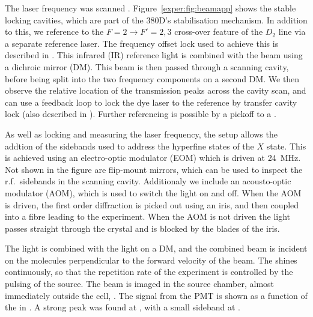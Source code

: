 The laser frequency was scanned . Figure~\ref{exper:fig:beamapp} shows the stable locking cavities,
which are part of the 380D's stabilisation mechanism. In addition to this, we
reference  to the $F=2 \rightarrow F'=2, 3$ cross-over feature of
the \esRb{} $D_2$ line via a separate reference laser. The frequency offset
lock used to achieve this is described in . This
infrared (IR) reference light is combined with the  beam using  a
dichroic mirror (DM). This beam is then passed through a scanning cavity,
before being split into the two frequency components on a second DM. We then
observe the relative location of the transmission peaks across the cavity scan,
and can use a feedback loop to lock the dye laser to the reference by transfer
cavity lock (also described in ). Further referencing
is possible by a pickoff to a .

As well as locking and measuring the laser frequency, the setup allows the
addtion of the sidebands used to address the hyperfine states of the $X$ state.
This is achieved using an electro-optic modulator (EOM) which is driven at
\SI{24}{\mega\hertz}.
%
Not shown in the figure are flip-mount mirrors, which can be used to inspect
the r.f.\ sidebands in the scanning cavity.
%
Additionaly we include an acousto-optic modulator (AOM),
which is used to switch the light on and off. When the AOM is driven, the first
order diffraction is picked out using an iris, and then coupled into a fibre
leading to the experiment. When the AOM is not driven the light passes straight
through the crystal and is blocked by the blades of the iris.

The  light is combined with the  light on a DM, and
the combined beam is incident on the \CaF{} molecules perpendicular to
the forward velocity of the beam. The shines continuously, so that the
repetition rate of the experiment is controlled by the pulsing of the \CaF{}
source. The beam is imaged in the source chamber, almost immediately outside
the cell, .
%
The signal from the PMT is shown as a function of the  in . A strong peak was found at
, with a small sideband at  . 

